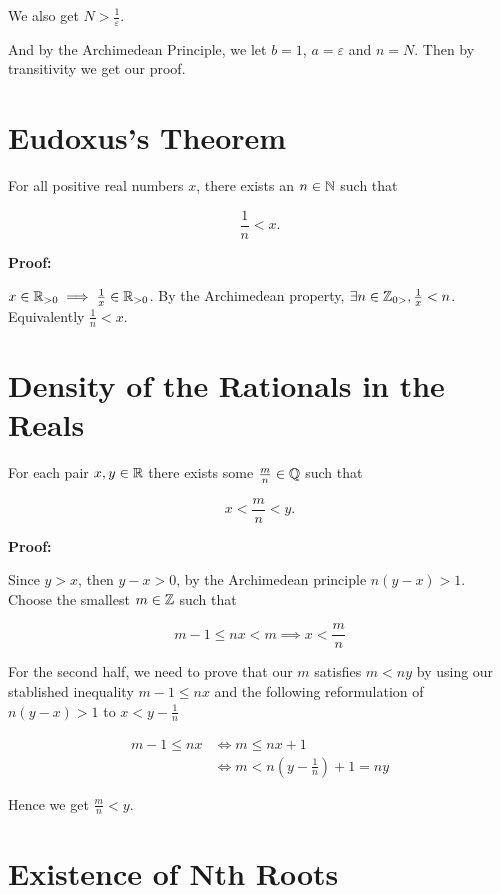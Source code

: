 We also get \(N > \frac{1}{\varepsilon}\).

And by the Archimedean Principle, we let \(b = 1\), \(a = \varepsilon\) and \(n = N\). Then by
transitivity we get our proof.

\QED

\section{Eudoxus's Theorem}

For all positive real numbers \(x\), there exists an \(n \in \mathbb{N}\) such that

\[
	\frac{1}{n} < x.
\]

\textbf{Proof:}

\(x \in \mathbb{R}_{> 0} \implies \frac{1}{x} \in \mathbb{R}_{> 0}\). By the Archimedean property, \(\exists n \in \mathbb{Z}_{0 >}, \frac{1}{x} < n\).
Equivalently \(\frac{1}{n} < x\).

\QED

\section{Density of the Rationals in the Reals}

For each pair \(x, y \in \mathbb{R}\) there exists some \(\frac{m}{n} \in \mathbb{Q}\) such that

\[
	x < \frac{m}{n} < y.
\]

\textbf{Proof:}

Since \(y > x\), then \(y - x > 0\), by the Archimedean principle \(n(y - x) > 1\). Choose the smallest \(m \in \mathbb{Z}\)
such that

\[
	m - 1 \le nx < m \implies x < \frac{m}{n}
\]

For the second half, we need to prove that our \(m\) satisfies \(m < ny\) by using our stablished
inequality \(m - 1 \le nx\) and the following reformulation of \(n(y - x) > 1\) to \(x < y - \frac{1}{n}\)

\begin{align*}
	m - 1 \le nx & \iff m \le nx + 1                     \\
	             & \iff m < n (y - \frac{1}{n}) + 1 = ny
\end{align*}

Hence we get \(\frac{m}{n} < y\).

\QED

\section{Existence of Nth Roots}

